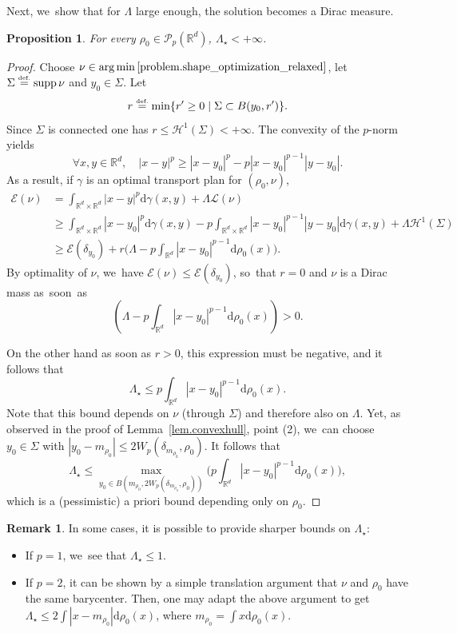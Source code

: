 \documentclass[JEP,XML,SOM,Unicode,NoFloatCountersInSection,published]{cedram}
\newtheorem{proposition}[theorem]{Proposition}
\theoremstyle{definition}
\newtheorem{remark}[theorem]{Remark}
\newcommand{\eqdef}{\ensuremath{\stackrel{\mbox{\upshape\tiny def.}}{=}}}
\newcommand\E{\mathcal{E}}
\newcommand\cH{\mathcal{H}}
\newcommand\cL{\mathcal{L}}
\newcommand{\RR}{\mathbb{R}}
\DeclareMathOperator*{\argmin}{arg\,min}
\DeclareMathOperator{\supp}{supp}
\newcommand\dd{\mathrm{d}}
\newcommand{\enscond}[2]{\{#1 \mid #2\} }
\newcommand{\abs}[1]{\left\lvert#1\right\rvert}
\begin{document}
Next, we~show that for $\Lambda$ large enough, the solution becomes a Dirac measure.

\begin{proposition}\label{proposition.critical_lambda_upper_bound}
For every $\rho_0 \in \mathcal{P}_p(\RR^d)$, $\Lambda_\star<+\infty$.
\end{proposition}

\begin{proof}
Choose $\nu \in \argmin \eqref{problem.shape_optimization_relaxed}$, let $\Sigma\eqdef \supp \nu$ and $y_0\in\Sigma$.
Let
\[
r\eqdef \min\enscond{r'\geq 0}{\Sigma \subset B(y_0,r')}.
\]
Since
$\Sigma$ is connected one has $r\leq \cH^1(\Sigma)<+\infty$.
The convexity of the $p$-norm yields
\begin{equation*}
\forall x,y \in \RR^d, \quad \abs{x-y}^p \geq \abs{x-y_0}^p -p\abs{x-y_0}^{p-1}\abs{y-y_0}.
\end{equation*}
As a result, if $\gamma$ is an optimal transport plan for $(\rho_0,\nu)$,
\begin{align*}
\E(\nu)&= \int_{\RR^d\times \RR^d}\abs{x-y}^p\dd \gamma(x,y)+\Lambda \cL(\nu)\\
&\geq \int_{\RR^d\times \RR^d}\abs{x-y_0}^p\dd \gamma(x,y) - p\int_{\RR^d\times \RR^d}\abs{x-y_0}^{p-1}\abs{y-y_0}\dd \gamma(x,y)+\Lambda \cH^1(\Sigma)\\
&\geq \E(\delta_{y_0})+ r \biggl(\Lambda - p\int_{\RR^d}\abs{x-y_0}^{p-1}\dd \rho_0(x) \biggr).
\end{align*}
By optimality of $\nu$, we~have $\E(\nu)\leq\E(\delta_{y_0})$, so~that $r=0$ and $\nu$ is a Dirac mass as~soon~as
\[
\left(\Lambda - p\int_{\RR^d}\abs{x-y_0}^{p-1}\dd \rho_0(x)\right)>0.
\]

On the other hand as soon as $r>0$, this expression
must be negative, and it follows that
\[
\Lambda_\star \le p\int_{\RR^d}\abs{x-y_0}^{p-1}\dd \rho_0(x).
\]
Note that this bound depends on $\nu$ (through $\Sigma$) and
therefore also on $\Lambda$.
Yet, as observed in the proof of
Lemma~\ref{lem.convexhull}, point (2), we~can choose $y_0\in\Sigma$
with $|y_0-m_{\rho_0}|\le 2W_p(\delta_{m_{\rho_0}},\rho_0)$. It follows that
\[
\Lambda_\star \le \max_{y_0
\in B(m_{\rho_0},2W_p(\delta_{m_{\rho_0}},\rho_0))}
\biggl(p\int_{\RR^d}\abs{x-y_0}^{p-1}\dd \rho_0(x) \biggr),
\]
which is a (pessimistic) a priori bound depending only on $\rho_0$.
\end{proof}

\begin{remark}
In some cases, it is possible to provide sharper bounds on $\Lambda_\star$:
\begin{itemize}
\item If $p=1$, we~see that $\Lambda_\star\leq 1$.
\item If $p=2$, it can be shown by a simple translation argument that $\nu$ and $\rho_0$ have the same barycenter. Then, one may adapt the above argument to get $\Lambda_\star \leq 2\int\abs{x-m_{\rho_0}}\dd \rho_0(x)$, where $m_{\rho_0}=\int x\dd \rho_0(x)$.
\end{itemize}
\end{remark}
\end{document}
